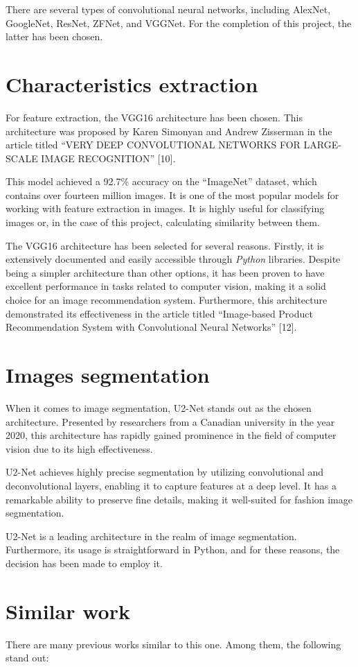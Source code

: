 \documentclass[12pt]{report} %
\begin{document}
There are several types of convolutional neural networks, including AlexNet, GoogleNet, ResNet, ZFNet, and VGGNet. For the completion of this project, the latter has been chosen.

\section*{Characteristics extraction}
For feature extraction, the VGG16 architecture has been chosen. This architecture was proposed by Karen Simonyan and Andrew Zisserman in the article titled ``VERY DEEP CONVOLUTIONAL NETWORKS FOR LARGE-SCALE IMAGE RECOGNITION'' [10].

This model achieved a 92.7\% accuracy on the ``ImageNet'' dataset, which contains over fourteen million images. It is one of the most popular models for working with feature extraction in images. It is highly useful for classifying images or, in the case of this project, calculating similarity between them.

The VGG16 architecture has been selected for several reasons. Firstly, it is extensively documented and easily accessible through \textit{Python} libraries. Despite being a simpler architecture than other options, it has been proven to have excellent performance in tasks related to computer vision, making it a solid choice for an image recommendation system. Furthermore, this architecture demonstrated its effectiveness in the article titled ``Image-based Product Recommendation System with Convolutional Neural Networks'' [12].
\section*{Images segmentation}
When it comes to image segmentation, U2-Net stands out as the chosen architecture. Presented by researchers from a Canadian university in the year 2020, this architecture has rapidly gained prominence in the field of computer vision due to its high effectiveness.

U2-Net achieves highly precise segmentation by utilizing convolutional and deconvolutional layers, enabling it to capture features at a deep level. It has a remarkable ability to preserve fine details, making it well-suited for fashion image segmentation.

U2-Net is a leading architecture in the realm of image segmentation. Furthermore, its usage is straightforward in Python, and for these reasons, the decision has been made to employ it.
\section*{Similar work}
There are many previous works similar to this one. Among them, the following stand out:
\end{document}
